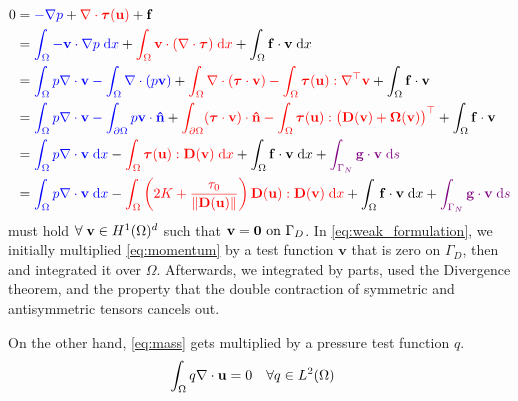 \documentclass[11 pt]{report}
\begin{document}
\begin{equation}
    \begin{aligned}
        0 &= {\color{blue}-\nabla p} + {\color{red} \nabla \cdot \boldsymbol{\tau}(\mathbf{u})} + \mathbf{f}\\
        &= {\color{blue} \int_{\Omega} - \mathbf{v} \cdot \nabla p \;\dd x} + {\color{red} \int_{\Omega} \mathbf{v} \cdot (\nabla \cdot \boldsymbol{\tau}) \;\dd x} + \int_{\Omega} \mathbf{f} \cdot \mathbf{v}  \;\dd x\\
        &= {\color{blue} \int_{\Omega} p \nabla \cdot \mathbf{v} - \int_{\Omega} \nabla \cdot (p\mathbf{v})} + {\color{red} \int_{\Omega} \nabla \cdot (\boldsymbol{\tau} \cdot \mathbf{v}) - \int_{\Omega}  \boldsymbol{\tau} (\mathbf{u}) : \nabla^\top \mathbf{v}} + \int_{\Omega} \mathbf{f} \cdot \mathbf{v}\\
        &= {\color{blue} \int_{\Omega} p \nabla \cdot \mathbf{v} - \int_{\partial \Omega} p \mathbf{v} \cdot \mathbf{\hat n}} + {\color{red} \int_{\partial\Omega} (\boldsymbol{\tau} \cdot \mathbf{v}) \cdot \mathbf{\hat n} - \int_{\Omega}  \boldsymbol{\tau} (\mathbf{u}) : \big(\mathbf{D}(\mathbf{v}) + \mathbf{\Omega}(\mathbf{v})\big)^\top} + \int_{\Omega} \mathbf{f} \cdot \mathbf{v} \\
        &= {\color{blue} \int_{\Omega} p \nabla \cdot \mathbf{v} \;\dd x} - {\color{red} \int_{\Omega}  \boldsymbol{\tau} (\mathbf{u}) : \mathbf{D}(\mathbf{v}) \;\dd x} + \int_{\Omega} \mathbf{f} \cdot \mathbf{v} \;\dd x + {\color{violet}\int_{\Gamma_N} \mathbf{g} \cdot \mathbf{v} \; \dd s}\\
        &= {\color{blue} \int_{\Omega} p \nabla \cdot \mathbf{v} \;\dd x} - {\color{red} \int_{\Omega}  \left( 2K + \frac{\tau_0}{\|\mathbf{D}(\mathbf{u})\|} \right) \mathbf{D}(\mathbf{u}) : \mathbf{D}(\mathbf{v}) \;\dd x} + \int_{\Omega} \mathbf{f} \cdot \mathbf{v} \;\dd x + {\color{violet}\int_{\Gamma_N} \mathbf{g} \cdot \mathbf{v} \; \dd s}
    \end{aligned}\label{eq:weak_formulation}
\end{equation}
 must hold $\forall \; \mathbf{v} \in H^1(\Omega)^d$ such that $\mathbf{v} = \mathbf{0} \text{ on } \Gamma_D$. In \cref{eq:weak_formulation}, we initially multiplied \cref{eq:momentum} by a test function $\mathbf{v}$ that is zero on $\Gamma_D$, then and integrated it over $\Omega$. Afterwards, we integrated by parts, used the Divergence theorem, and the property that the double contraction of symmetric and antisymmetric tensors cancels out.

On the other hand, \cref{eq:mass} gets multiplied by a pressure test function $q$.
\begin{equation}
    \begin{aligned}
        \int_{\Omega} q \nabla \cdot \mathbf{u} &= 0  && \forall q \in L^2(\Omega)
    \end{aligned}
    \label{eq:weak_formulation_p}
\end{equation}
\end{document}
